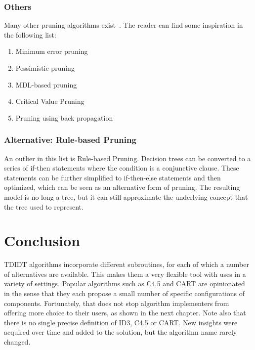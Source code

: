 \subsubsection{Others}
Many other pruning algorithms exist~\cite{mingers1989empirical, breslow1997simplifying, elomaa1999biases, esposito1997comparative}. The reader can find some inspiration in the following list:

\begin{enumerate}
    \item Minimum error pruning~\cite{niblett1986learning}
    \item Pessimistic pruning~\cite{mansour1997pessimistic, quinlan1987simplifying, c45}
    \item MDL-based pruning~\cite{mdlpruning, quinlan1989inferring}
    \item Critical Value Pruning~\cite{mingers1987rule}
    \item Pruning using back propagation~\cite{backproppruning}
\end{enumerate}

\subsubsection{Alternative: Rule-based Pruning}
An outlier in this list is Rule-based Pruning. Decision trees can be converted to a series of if-then statements where the condition is a conjunctive clause. These statements can be further simplified to if-then-else statements and then optimized, which can be seen as an alternative form of pruning. The resulting model is no long a tree, but it can still approximate the underlying concept that the tree used to represent.

\section{Conclusion}
TDIDT algorithms incorporate different subroutines, for each of which a number of alternatives are available. This makes them a very flexible tool with uses in a variety of settings. Popular algorithms such as C4.5 and CART are opinionated in the sense that they each propose a small number of specific configurations of components. Fortunately, that does not stop algorithm implementers from offering more choice to their users, as shown in the next chapter. Note also that there is no single precise definition of ID3, C4.5 or CART. New insights were acquired over time and added to the solution, but the algorithm name rarely changed.